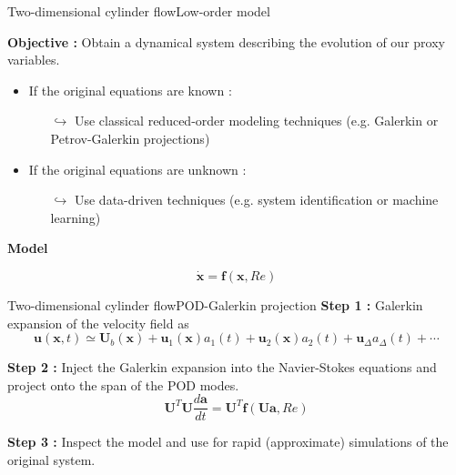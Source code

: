 \documentclass[usenames,dvipsnames,svgnames,10pt,aspectratio=169]{beamer}
\begin{document}
\begin{frame}[t, c]{Two-dimensional cylinder flow}{Low-order model}
  \begin{minipage}{.68\textwidth}
    \begin{tcolorbox}[colframe=beamer@kthblue, colback=white]
      \textbf{Objective :} Obtain a dynamical system describing the evolution of our proxy variables.
    \end{tcolorbox}

    \bigskip

    \begin{itemize}
    \item If the original equations are known :
      \begin{itemize}
      \item[$\hookrightarrow$] Use classical reduced-order modeling techniques (e.g. Galerkin or Petrov-Galerkin projections)
      \end{itemize}

      \medskip

    \item If the original equations are unknown :
      \begin{itemize}
      \item[$\hookrightarrow$] Use data-driven techniques (e.g. system identification or machine learning)
      \end{itemize}
    \end{itemize}
  \end{minipage}%
  \hfill
  \begin{minipage}{.28\textwidth}
    \centering
    \textbf{Model}

    \[
    \dot{\bm{x}} = \bm{f}(\bm{x}, Re)
    \]
  \end{minipage}
\end{frame}





\begin{frame}[t, c]{Two-dimensional cylinder flow}{POD-Galerkin projection}
  \textbf{Step 1 :} Galerkin expansion of the velocity field as
  \[
  \bm{u}(\bm{x}, t) \simeq \bm{U}_b(\bm{x}) + \bm{u}_1(\bm{x}) a_1(t) + \bm{u}_2(\bm{x}) a_2(t) + \bm{u}_{\Delta} a_{\Delta}(t) + \cdots
  \]

  \medskip

  \textbf{Step 2 :} Inject the Galerkin expansion into the Navier-Stokes equations and project onto the span of the POD modes.
  \[
  \bm{U}^T \bm{U} \dfrac{d \bm{a}}{dt} = \bm{U}^T \bm{f}(\bm{Ua}, Re)
  \]

  \medskip

  \textbf{Step 3 :} Inspect the model and use for rapid (approximate) simulations of the original system.
\end{frame}
\end{document}
